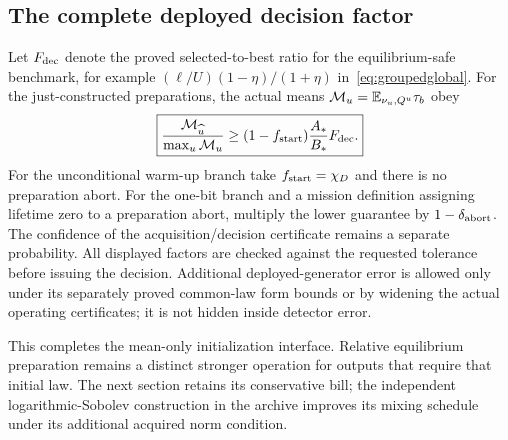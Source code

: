\subsection{The complete deployed decision factor}
Let $F_{\rm dec}$ denote the proved selected-to-best ratio for the
equilibrium-safe benchmark, for example
$(\ell/U)(1-\eta)/(1+\eta)$ in~\eqref{eq:groupedglobal}.
For the just-constructed preparations, the actual means
$\mathcal M_u=\mathbb E_{\nu_u,Q^u}\tau_b$ obey
\begin{equation}
 \boxed{\frac{\mathcal M_{\widehat u}}{\max_u\mathcal M_u}
 \ge (1-f_{\rm start})\frac{A_*}{B_*}F_{\rm dec}.}
 \label{eq:deployedsafe}
\end{equation}
For the unconditional warm-up branch take $f_{\rm start}=\chi_D$ and
there is no preparation abort. For the one-bit branch and a mission
definition assigning lifetime zero to a preparation abort,
multiply the lower guarantee by $1-\delta_{\rm abort}$. The confidence
of the acquisition/decision certificate remains a separate probability.
All displayed factors are checked against the requested tolerance before
issuing the decision. Additional deployed-generator error is allowed only
under its separately proved common-law form bounds or by widening the
actual operating certificates; it is not hidden inside detector error.

This completes the mean-only initialization interface. Relative equilibrium
preparation remains a distinct stronger operation for outputs that require
that initial law. The next section retains its conservative bill; the
independent logarithmic-Sobolev construction in the archive improves its
mixing schedule under its additional acquired norm condition.
